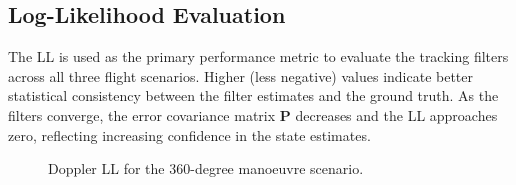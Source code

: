 \documentclass[conference,10pt,a4paper]{IEEEtran}%
\begin{document}
\subsection{Log-Likelihood Evaluation}                                   
The LL is used as the primary performance metric to evaluate the tracking filters across all three flight scenarios. Higher (less negative) values indicate better statistical consistency between the filter estimates and the ground truth. As the filters converge, the error covariance matrix $\mathbf{P}$ decreases and the LL approaches zero, reflecting increasing confidence in the state estimates.

\begin{figure}[t]                                                 
  \centering
  
  \caption{Doppler LL for the 360-degree manoeuvre scenario.}
  \label{fig:dopplerLogLike360}
\end{figure}
\end{document}
